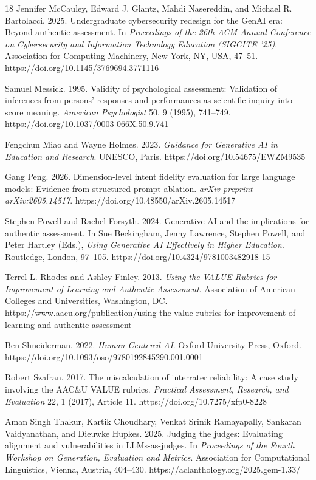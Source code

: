 \documentclass[sigconf]{acmart}
\begin{document}
\begin{thebibliography}{18}
Jennifer McCauley, Edward J. Glantz, Mahdi Nasereddin, and Michael R. Bartolacci. 2025. Undergraduate cybersecurity redesign for the GenAI era: Beyond authentic assessment. In \emph{Proceedings of the 26th ACM Annual Conference on Cybersecurity and Information Technology Education (SIGCITE '25)}. Association for Computing Machinery, New York, NY, USA, 47--51. https://doi.org/10.1145/3769694.3771116

Samuel Messick. 1995. Validity of psychological assessment: Validation of inferences from persons' responses and performances as scientific inquiry into score meaning. \emph{American Psychologist} 50, 9 (1995), 741--749. https://doi.org/10.1037/0003-066X.50.9.741

Fengchun Miao and Wayne Holmes. 2023. \emph{Guidance for Generative AI in Education and Research}. UNESCO, Paris. https://doi.org/10.54675/EWZM9535

Gang Peng. 2026. Dimension-level intent fidelity evaluation for large language models: Evidence from structured prompt ablation. \emph{arXiv preprint arXiv:2605.14517}. https://doi.org/10.48550/arXiv.2605.14517

Stephen Powell and Rachel Forsyth. 2024. Generative AI and the implications for authentic assessment. In Sue Beckingham, Jenny Lawrence, Stephen Powell, and Peter Hartley (Eds.), \emph{Using Generative AI Effectively in Higher Education}. Routledge, London, 97--105. https://doi.org/10.4324/9781003482918-15

Terrel L. Rhodes and Ashley Finley. 2013. \emph{Using the VALUE Rubrics for Improvement of Learning and Authentic Assessment}. Association of American Colleges and Universities, Washington, DC. https://www.aacu.org/publication/using-the-value-rubrics-for-improvement-of-learning-and-authentic-assessment

Ben Shneiderman. 2022. \emph{Human-Centered AI}. Oxford University Press, Oxford. https://doi.org/10.1093/oso/9780192845290.001.0001

Robert Szafran. 2017. The miscalculation of interrater reliability: A case study involving the AAC\&U VALUE rubrics. \emph{Practical Assessment, Research, and Evaluation} 22, 1 (2017), Article 11. https://doi.org/10.7275/xfp0-8228

Aman Singh Thakur, Kartik Choudhary, Venkat Srinik Ramayapally, Sankaran Vaidyanathan, and Dieuwke Hupkes. 2025. Judging the judges: Evaluating alignment and vulnerabilities in LLMs-as-judges. In \emph{Proceedings of the Fourth Workshop on Generation, Evaluation and Metrics}. Association for Computational Linguistics, Vienna, Austria, 404--430. https://aclanthology.org/2025.gem-1.33/


\end{thebibliography}
\end{document}
